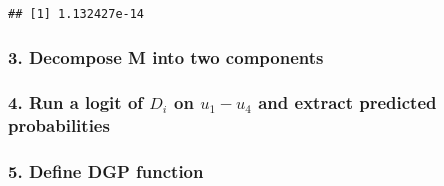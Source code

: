 \documentclass[
]{article}
\newenvironment{Shaded}{\begin{snugshade}}{\end{snugshade}}
\newcommand{\DataTypeTok}[1]{\textcolor[rgb]{0.13,0.29,0.53}{#1}}
\newcommand{\DecValTok}[1]{\textcolor[rgb]{0.00,0.00,0.81}{#1}}
\newcommand{\KeywordTok}[1]{\textcolor[rgb]{0.13,0.29,0.53}{\textbf{#1}}}
\newcommand{\NormalTok}[1]{#1}
\newcommand{\OperatorTok}[1]{\textcolor[rgb]{0.81,0.36,0.00}{\textbf{#1}}}
\newcommand{\StringTok}[1]{\textcolor[rgb]{0.31,0.60,0.02}{#1}}
\begin{document}
\begin{verbatim}
## [1] 1.132427e-14
\end{verbatim}

\hypertarget{decompose-m-into-two-components}{%
\subsubsection{3. Decompose M into two
components}\label{decompose-m-into-two-components}}

\begin{Shaded}
\end{Shaded}

\hypertarget{run-a-logit-of-d_i-on-u_1-u_4-and-extract-predicted-probabilities}{%
\subsubsection{\texorpdfstring{4. Run a logit of \(D_i\) on
\({u_1-u_4}\) and extract predicted
probabilities}{4. Run a logit of D\_i on \{u\_1-u\_4\} and extract predicted probabilities}}\label{run-a-logit-of-d_i-on-u_1-u_4-and-extract-predicted-probabilities}}

\begin{Shaded}
\end{Shaded}

\hypertarget{define-dgp-function}{%
\subsubsection{5. Define DGP function}\label{define-dgp-function}}
\end{document}
